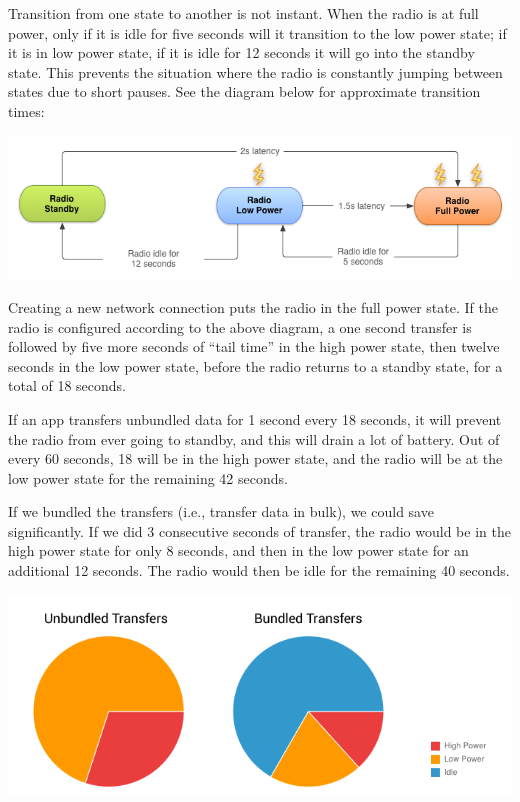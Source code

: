 Transition from one state to another is not instant. When the radio is at full power, only if it is idle for five seconds will it transition to the low power state; if it is in low power state, if it is idle for 12 seconds it will go into the standby state. This prevents the situation where the radio is constantly jumping between states due to short pauses. See the diagram below for approximate transition times:

\begin{center}
	\includegraphics[width=\textwidth]{images/mobile_radio_state_machine.png}
\cite{android:network2}
\end{center}

Creating a new network connection puts the radio in the full power state. If the radio is configured according to the above diagram, a one second transfer is followed by five more seconds of ``tail time'' in the high power state, then twelve seconds in the low power state, before the radio returns to a standby state, for a total of 18 seconds.

If an app transfers unbundled data for 1 second every 18 seconds, it will prevent the radio from ever going to standby, and this will drain a lot of battery. Out of every 60 seconds, 18 will be in the high power state, and the radio will be at the low power state for the remaining 42 seconds.

If we bundled the transfers (i.e., transfer data in bulk), we could save significantly. If we did 3 consecutive seconds of transfer, the radio would be in the high power state for only 8 seconds, and then in the low power state for an additional 12 seconds. The radio would then be idle for the remaining 40 seconds.
\begin{center}
	\includegraphics[width=\textwidth]{images/batteryusage.png}

\end{center}

